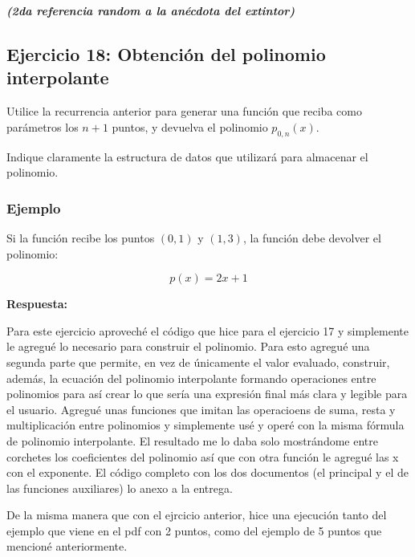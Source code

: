 \documentclass[12pt]{article}
\newcommand{\respuesta}{
    \vspace{0.3cm}
    \noindent\textbf{Respuesta:}
    \vspace{0.2cm}
}
\begin{document}
\faFireExtinguisher \quad
\faFireExtinguisher \quad
\faFireExtinguisher \quad
\faFireExtinguisher \quad
\faFireExtinguisher \quad
\faFireExtinguisher \quad
\faFireExtinguisher \quad
\faFireExtinguisher \quad
\faFireExtinguisher \quad
\faFireExtinguisher \quad
\faFireExtinguisher \quad
\faFireExtinguisher \quad
\faFireExtinguisher \quad
\faFireExtinguisher \quad
\faFireExtinguisher \quad
\faFireExtinguisher \quad
\faFireExtinguisher \quad
\faFireExtinguisher \quad
\faFireExtinguisher \quad
\faFireExtinguisher

\textbf{\textit{(2da referencia random a la anécdota del extintor)}}
\subsection*{Ejercicio 18: Obtención del polinomio interpolante}

Utilice la recurrencia anterior para generar una función que reciba como parámetros los $n + 1$ puntos, y devuelva el polinomio $p_{0,n}(x)$.

Indique claramente la estructura de datos que utilizará para almacenar el polinomio.
\subsubsection*{Ejemplo}

Si la función recibe los puntos $(0,1)$ y $(1,3)$, la función debe devolver el polinomio:

\[
p(x) = 2x + 1
\]

\respuesta
Para este ejercicio aproveché el código que hice para el ejercicio 17 y simplemente le agregué lo necesario para construir el polinomio. Para esto agregué una segunda parte que permite, en vez de únicamente el valor evaluado, construir, además, la ecuación del polinomio interpolante formando operaciones entre polinomios para así crear lo que sería una expresión final más clara y legible para el usuario. Agregué unas funciones que imitan las operacioens de suma, resta y multiplicación entre polinomios y simplemente usé y operé con la misma fórmula de polinomio interpolante. El resultado me lo daba solo mostrándome entre corchetes los coeficientes del polinomio así que con otra función le agregué las x con el exponente. El código completo con los dos documentos (el principal y el de las funciones auxiliares) lo anexo a la entrega.

De la misma manera que con el ejrcicio anterior, hice una ejecución tanto del ejemplo que viene en el pdf con 2 puntos, como del ejemplo de 5 puntos que mencioné anteriormente.
\end{document}
